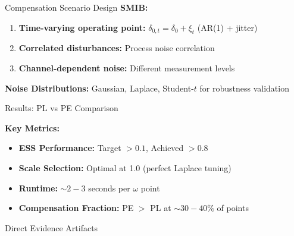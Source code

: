 \documentclass[final,hyperref={pdfpagelabels=false}]{beamer}
\begin{document}
\begin{frame}[t]
\begin{columns}[t,totalwidth=\textwidth]
\begin{column}{0.36\textwidth}
\begin{alertblock}{Compensation Scenario Design}
\textbf{SMIB:}
\begin{enumerate}
\item \textbf{Time-varying operating point:} $\delta_{0,t} = \delta_0 + \xi_t$ (AR(1) + jitter)
\item \textbf{Correlated disturbances:} Process noise correlation
\item \textbf{Channel-dependent noise:} Different measurement levels
\end{enumerate}

\textbf{Noise Distributions:} Gaussian, Laplace, Student-$t$ for robustness validation

\end{alertblock}

\begin{block}{Results: PL vs PE Comparison}
\small

\begin{center}
\end{center}

\textbf{Key Metrics:}
\begin{itemize}
\item \textbf{ESS Performance:} Target $> 0.1$, Achieved $> 0.8$
\item \textbf{Scale Selection:} Optimal at 1.0 (perfect Laplace tuning)
\item \textbf{Runtime:} $\sim 2-3$ seconds per $\omega$ point
\item \textbf{Compensation Fraction:} PE $>$ PL at $\sim 30-40\%$ of points
\end{itemize}

\end{block}

\begin{exampleblock}{Direct Evidence Artifacts}
\small

\begin{center}
\end{center}


\end{exampleblock}
\end{column}
\end{columns}
\end{frame}
\end{document}
